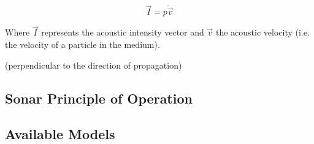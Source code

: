 \begin{equation}\label{eq:intensity_mean}
\vec{I} = \overline{p\vec{v}}
\end{equation}

Where $\vec{I}$ represents the acoustic intensity vector and $\vec{v}$ the
acoustic velocity (i.e. the velocity of a particle in the medium).

 (perpendicular to the direction of propagation)


\subsection{Sonar Principle of Operation}

\cite{LURTON} %

\subsection{Available Models}
 
\cite{sonars:16} %
